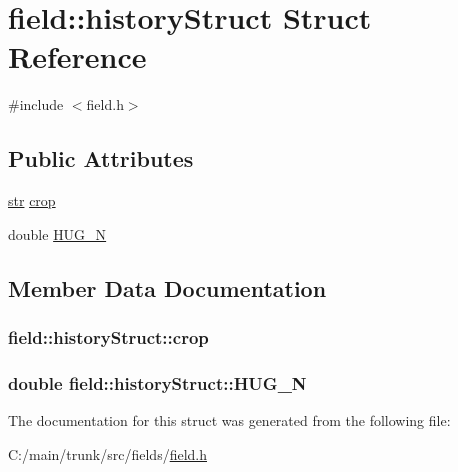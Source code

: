 \hypertarget{structfield_1_1history_struct}{
\section{field::historyStruct Struct Reference}
\label{structfield_1_1history_struct}
}


{\ttfamily \#include $<$field.h$>$}\subsection*{Public Attributes}
\begin{DoxyCompactItemize}
\item 
\hyperlink{classfield_a6f1744c3ac290d5fc0ef66302c0ec632}{str} \hyperlink{structfield_1_1history_struct_a0f6b273c01cea35081b484870dc1c626}{crop}
\item 
double \hyperlink{structfield_1_1history_struct_a778e6cd552543cb73748d043eb4ab70b}{HUG\_\-N}
\end{DoxyCompactItemize}


\subsection{Member Data Documentation}
\hypertarget{structfield_1_1history_struct_a0f6b273c01cea35081b484870dc1c626}{
\subsubsection[{crop}]{ {\bf field::historyStruct::crop}}}
\label{structfield_1_1history_struct_a0f6b273c01cea35081b484870dc1c626}
\hypertarget{structfield_1_1history_struct_a778e6cd552543cb73748d043eb4ab70b}{
\subsubsection[{HUG\_\-N}]{\setlength{\rightskip}{0pt plus 5cm}double {\bf field::historyStruct::HUG\_\-N}}}
\label{structfield_1_1history_struct_a778e6cd552543cb73748d043eb4ab70b}


The documentation for this struct was generated from the following file:\begin{DoxyCompactItemize}
\item 
C:/main/trunk/src/fields/\hyperlink{field_8h}{field.h}\end{DoxyCompactItemize}
